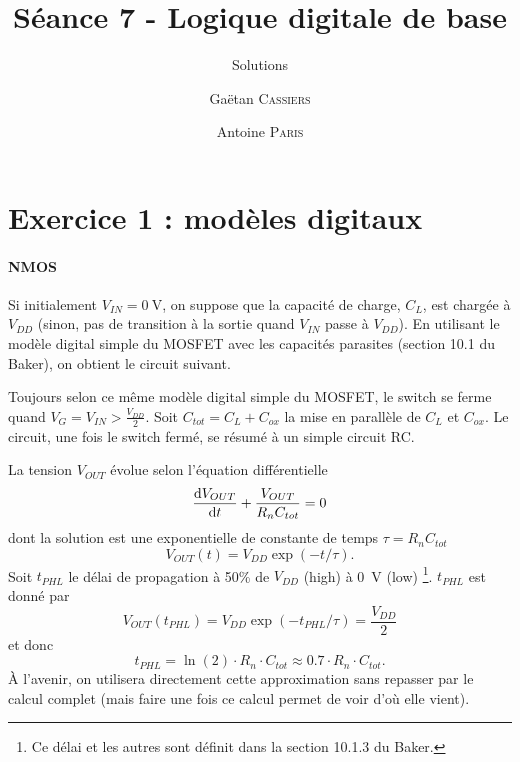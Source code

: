 \documentclass[frenchb,DIV=14]{scrartcl}
\title{Séance 7 - Logique digitale de base}
\subtitle{Solutions}
\author{\small Gaëtan \textsc{Cassiers} \and\small Antoine \textsc{Paris}}
\date{}
\begin{document}
\maketitle

\section*{Exercice 1 : modèles digitaux}
\paragraph{NMOS}
Si initialement $V_{IN} = \SI{0}{\volt}$, on suppose que la capacité de charge,
$C_L$, est chargée à $V_{DD}$ (sinon, pas de transition à la sortie quand $V_{IN}$
passe à $V_{DD}$). En utilisant le modèle digital simple du MOSFET avec les
capacités parasites (section 10.1 du Baker), on obtient le circuit suivant.

\begin{center}
\end{center}

Toujours selon ce même modèle digital simple du MOSFET, le switch se ferme
quand $V_G = V_{IN} > \frac{V_{DD}}{2}$.
Soit $C_{tot} = C_L + C_{ox}$ la mise en parallèle de $C_L$ et $C_{ox}$. Le
circuit, une fois le switch fermé, se résumé à un simple circuit RC.

\begin{center}
\end{center}

La tension $V_{OUT}$ évolue selon l'équation différentielle
\[ \frac{\operatorname{d}\! V_{OUT}}{\operatorname{d}\! t} + \frac{V_{OUT}}{R_nC_{tot}} = 0 \]
dont la solution est une exponentielle de constante de temps $\tau = R_nC_{tot}$
\[ V_{OUT}(t) = V_{DD}\exp\left(-t/\tau\right).\]
Soit $t_{PHL}$ le délai de propagation à 50\% de $V_{DD}$ (high) à \SI{0}{\volt} (low)
\footnote{Ce délai et les autres sont définit dans la section 10.1.3 du Baker.}.
$t_{PHL}$ est donné par
\[ V_{OUT}(t_{PHL}) = V_{DD}\exp\left(-t_{PHL}/\tau\right) = \frac{V_{DD}}{2} \]
et donc
\[ t_{PHL} = \ln(2)\cdot R_n\cdot C_{tot} \approx 0.7\cdot R_n\cdot C_{tot}. \]
\`{A} l'avenir, on utilisera directement cette approximation sans repasser par le calcul
complet (mais faire une fois ce calcul permet de voir d'où elle vient).
\end{document}
